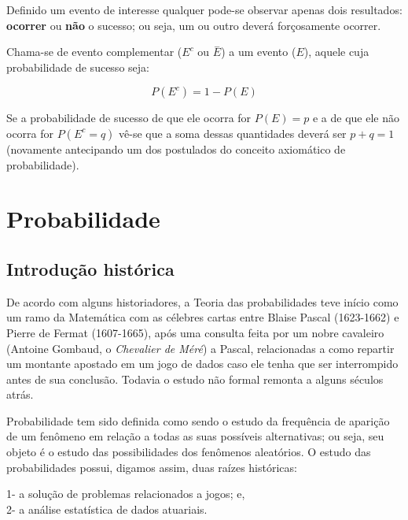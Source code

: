 \documentclass[
]{book}
\begin{document}
Definido um evento de interesse qualquer pode-se observar apenas dois resultados: \textbf{ocorrer} ou \textbf{não} o sucesso; ou seja, um ou outro deverá forçosamente ocorrer.

Chama-se de evento complementar (\(E^{c}\) ou \(\stackrel{-}{E}\)) a um evento (\(E\)), aquele cuja probabilidade de sucesso seja:

\[
P(E^{c}) = 1 - P(E)
\]

Se a probabilidade de sucesso de que ele ocorra for \(P(E)=p\) e a de que ele não ocorra for \(P(E^{c}= q)\) vê-se que a soma dessas quantidades deverá ser \(p + q =1\) (novamente antecipando um dos postulados do conceito axiomático de probabilidade).

\hypertarget{probabilidade}{%
\section{Probabilidade}\label{probabilidade}}

\hypertarget{introduuxe7uxe3o-histuxf3rica}{%
\subsection{Introdução histórica}\label{introduuxe7uxe3o-histuxf3rica}}

De acordo com alguns historiadores, a Teoria das probabilidades teve início como um ramo da Matemática com as célebres cartas entre Blaise Pascal (1623-1662) e Pierre de Fermat (1607-1665), após uma consulta feita por um nobre cavaleiro (Antoine Gombaud, o \emph{Chevalier de Méré}) a Pascal, relacionadas a como repartir um montante apostado em um jogo de dados caso ele tenha que ser interrompido antes de sua conclusão. Todavia o estudo não formal remonta a alguns séculos atrás.

\hfill\break

Probabilidade tem sido definida como sendo o estudo da frequência de aparição de um fenômeno em relação a todas as suas possíveis alternativas; ou seja, seu objeto é o estudo das possibilidades dos fenômenos aleatórios. O estudo das probabilidades possui, digamos assim, duas raízes históricas:

\hfill\break

1- a solução de problemas relacionados a jogos; e,\\
2- a análise estatística de dados atuariais.

\hfill\break
\end{document}
